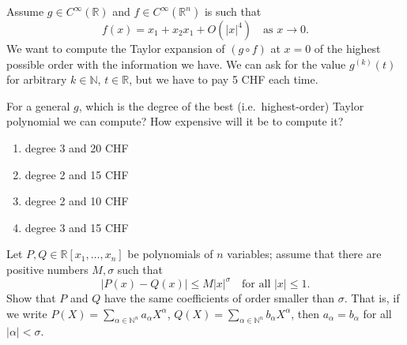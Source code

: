 \begin{exercise}
\label{ex:5.5}
Assume $g \in C^\infty(\mathbb{R})$ and $f \in C^\infty(\mathbb{R}^n)$ is such that
$$f(x) = x_1 + x_2x_1 + O(|x|^4) \quad \text{as } x \to 0.$$
We want to compute the Taylor expansion of $(g\circ f)$ at $x = 0$ of the highest possible order
with the information we have. We can ask for the value $g^{(k)}(t)$ for arbitrary
$k \in \mathbb{N}$, $t \in \mathbb{R}$, but we have to pay 5 CHF each time.

For a general $g$, which is the degree of the best (i.e.\ highest-order) Taylor polynomial we can
compute? How expensive will it be to compute it?
\begin{enumerate}[label=\textbf{(\alph*)}]
  \item degree 3 and 20 CHF
  \item degree 2 and 15 CHF
  \item degree 2 and 10 CHF
  \item degree 3 and 15 CHF
\end{enumerate}
\end{exercise}

\begin{exercise}
\label{ex:5.6}
Let $P, Q \in \mathbb{R}[x_1,\dots,x_n]$ be polynomials of $n$ variables; assume that there are
positive numbers $M, \sigma$ such that
$$|P(x) - Q(x)| \leq M|x|^\sigma \quad \text{for all } |x| \leq 1.$$
Show that $P$ and $Q$ have the same coefficients of order smaller than $\sigma$. That is, if we
write $P(X) = \sum_{\alpha\in\mathbb{N}^n} a_\alpha X^\alpha$,
$Q(X) = \sum_{\alpha\in\mathbb{N}^n} b_\alpha X^\alpha$, then $a_\alpha = b_\alpha$ for all
$|\alpha| < \sigma$.
\end{exercise}

